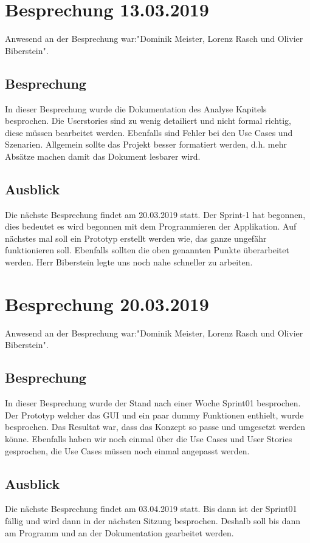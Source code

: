 \documentclass[a4paper,parskip]{scrartcl}
\begin{document}
\section{Besprechung 13.03.2019}
Anwesend an der Besprechung war:"Dominik Meister, Lorenz Rasch und Olivier Biberstein". 
\subsection{Besprechung}
In dieser Besprechung wurde die Dokumentation des Analyse Kapitels besprochen. Die Userstories sind zu wenig detailiert und nicht formal richtig, diese müssen bearbeitet werden. Ebenfalls sind Fehler bei den Use Cases und Szenarien. Allgemein sollte das Projekt besser formatiert werden, d.h. mehr Absätze machen damit das Dokument lesbarer wird.
\subsection{Ausblick}
Die nächste Besprechung findet am 20.03.2019 statt. Der Sprint-1 hat begonnen, dies bedeutet es wird begonnen mit dem Programmieren der Applikation. Auf nächstes mal soll ein Prototyp erstellt werden wie, das ganze ungefähr funktionieren soll. Ebenfalls sollten die oben genannten Punkte überarbeitet werden. Herr Biberstein legte uns noch nahe schneller zu arbeiten. 

\section{Besprechung 20.03.2019}
Anwesend an der Besprechung war:"Dominik Meister, Lorenz Rasch und Olivier Biberstein". 
\subsection{Besprechung}
In dieser Besprechung wurde der Stand nach einer Woche Sprint01 besprochen. Der Prototyp welcher das GUI und ein paar dummy Funktionen enthielt, wurde 
besprochen. Das Resultat war, dass das Konzept so passe und umgesetzt werden könne. Ebenfalls haben wir noch einmal über die Use Cases und User Stories gesprochen, die Use Cases müssen noch einmal angepasst werden.
\subsection{Ausblick}
Die nächste Besprechung findet am 03.04.2019 statt. Bis dann ist der Sprint01 fällig und wird dann in der nächsten Sitzung besprochen. Deshalb soll bis
dann am Programm und an der Dokumentation gearbeitet werden. 
\end{document}
